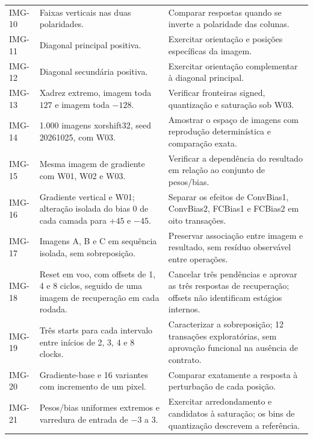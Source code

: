 \documentclass[12pt,a4paper]{article}
\begin{document}
\begin{longtable}{p{1.5cm}p{10.8cm}p{10.8cm}}
IMG-10 & Faixas verticais nas duas polaridades. & Comparar respostas quando se inverte a polaridade das colunas.\\
IMG-11 & Diagonal principal positiva. & Exercitar orientação e posições específicas da imagem.\\
IMG-12 & Diagonal secundária positiva. & Exercitar orientação complementar à diagonal principal.\\
IMG-13 & Xadrez extremo, imagem toda $127$ e imagem toda $-128$. & Verificar fronteiras signed, quantização e saturação sob W03.\\
IMG-14 & 1.000 imagens xorshift32, seed 20261025, com W03. & Amostrar o espaço de imagens com reprodução determinística e comparação exata.\\
IMG-15 & Mesma imagem de gradiente com W01, W02 e W03. & Verificar a dependência do resultado em relação ao conjunto de pesos/bias.\\
IMG-16 & Gradiente vertical e W01; alteração isolada do bias 0 de cada camada para $+45$ e $-45$. & Separar os efeitos de ConvBias1, ConvBias2, FCBias1 e FCBias2 em oito transações.\\
IMG-17 & Imagens A, B e C em sequência isolada, sem sobreposição. & Preservar associação entre imagem e resultado, sem resíduo observável entre operações.\\
IMG-18 & Reset em voo, com offsets de 1, 4 e 8 ciclos, seguido de uma imagem de recuperação em cada rodada. & Cancelar três pendências e aprovar as três respostas de recuperação; offsets não identificam estágios internos.\\
IMG-19 & Três starts para cada intervalo entre inícios de 2, 3, 4 e 8 clocks. & Caracterizar a sobreposição; 12 transações exploratórias, sem aprovação funcional na ausência de contrato.\\
IMG-20 & Gradiente-base e 16 variantes com incremento de um pixel. & Comparar exatamente a resposta à perturbação de cada posição.\\
IMG-21 & Pesos/bias uniformes extremos e varredura de entrada de $-3$ a $3$. & Exercitar arredondamento e candidatos à saturação; os bins de quantização descrevem a referência.\\
\bottomrule
\end{longtable}
\normalsize
\end{document}
